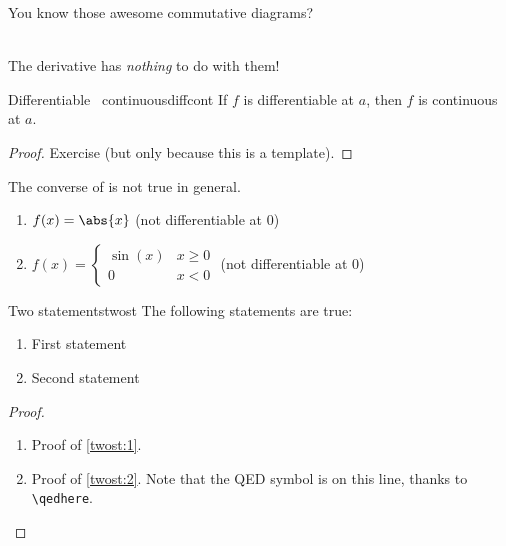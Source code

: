 \begin{center}
You know those awesome commutative diagrams?\\
\\
The derivative has \emph{nothing} to do with them!
\end{center}

\begin{proposition}{Differentiable \implies\ continuous}{diffcont}
If $f$ is differentiable at $a$, then $f$ is continuous at $a$.
\end{proposition}
\begin{proof}
Exercise (but only because this is a template).
\end{proof}

The converse of  is not true in general.

\begin{examples}\leavevmode %
\begin{enumerate}
    \item $f(x)=\abs{x}$ \hfill (not differentiable at $0$)
    \item $f(x)=\begin{cases} \sin(x) & x\ge 0 \\ 0 & x<0 \end{cases}$ \hfill (not differentiable at $0$)
\end{enumerate}
\end{examples}

\begin{theorem}{Two statements}{twost}
The following statements are true:
\begin{enumerate}[ref={(\arabic*)}]
    \item\label{twost:1} First statement
    \item\label{twost:2} Second statement
\end{enumerate}
\end{theorem}
\begin{proof}%
\begin{enumerate}
    \item Proof of \ref{twost:1}.
    \item Proof of \ref{twost:2}. Note that the QED symbol is on this line, thanks to \verb!\qedhere!. \qedhere %
\end{enumerate}
\end{proof}

